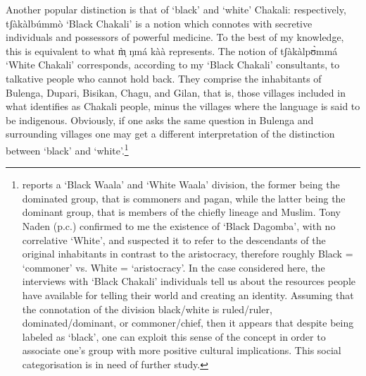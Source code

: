 Another popular distinction is that of `black' and `white' Chakali: respectively,  {\sls tʃàkàlbúmmò} `Black Chakali'  is a notion which connotes with secretive individuals and possessors of powerful medicine. To the best of my knowledge, this is equivalent to what {\sls m̩̀ ŋmá kàà} represents. The notion of  {\sls tʃàkàlpʊ̀mmá}  `White Chakali' corresponds, according to my ‘Black Chakali’ consultants, to talkative people who cannot hold back. They comprise the inhabitants of Bulenga, Dupari, Bisikan, Chagu, and Gilan, that
is, those villages included in what \citet[2--3]{Daan94} identifies as Chakali people, minus the
villages where the language is said to be indigenous.  Obviously, if one asks the same question
in Bulenga and surrounding villages one may get a different interpretation of the distinction
between ‘black’ and ‘white’.\footnote{\citet[14--15]{Good54} reports a `Black Waala' and `White Waala' division, the former being the dominated group, that is commoners and pagan, while the latter being the dominant group, that is members of the chiefly lineage and Muslim. Tony Naden (p.c.) confirmed to me the existence of  `Black Dagomba', with no correlative `White', and suspected it to refer to the descendants of the original inhabitants in contrast to the aristocracy, therefore roughly Black = ‘commoner’ vs. White = ‘aristocracy’. In the case considered here, the interviews with `Black Chakali' individuals tell us about the resources people have available for telling their world and creating an identity. Assuming that the connotation of the division black/white is ruled/ruler, dominated/dominant, or commoner/chief, then it appears that despite being labeled as ‘black’, one can exploit this sense of the concept in order to associate one’s group with more positive cultural implications. This social categorisation is in need of further study.}


